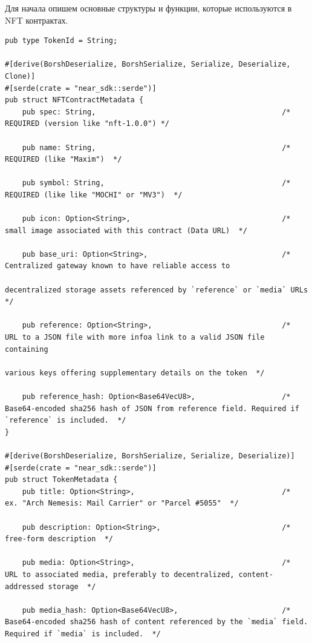 Для начала опишем основные структуры и функции\cite{corestandard}, которые используются в NFT контрактах.

\begin{verbatim}
pub type TokenId = String;

#[derive(BorshDeserialize, BorshSerialize, Serialize, Deserialize, Clone)]
#[serde(crate = "near_sdk::serde")]
pub struct NFTContractMetadata {
    pub spec: String,                                           /*  REQUIRED (version like "nft-1.0.0") */

    pub name: String,                                           /*  REQUIRED (like "Maxim")  */

    pub symbol: String,                                         /*  REQUIRED (like like "MOCHI" or "MV3")  */

    pub icon: Option<String>,                                   /*  small image associated with this contract (Data URL)  */

    pub base_uri: Option<String>,                               /*  Centralized gateway known to have reliable access to
                                                                    decentralized storage assets referenced by `reference` or `media` URLs  */

    pub reference: Option<String>,                              /*  URL to a JSON file with more infoa link to a valid JSON file containing
                                                                    various keys offering supplementary details on the token  */

    pub reference_hash: Option<Base64VecU8>,                    /*  Base64-encoded sha256 hash of JSON from reference field. Required if `reference` is included.  */
}

#[derive(BorshDeserialize, BorshSerialize, Serialize, Deserialize)]
#[serde(crate = "near_sdk::serde")]
pub struct TokenMetadata {
    pub title: Option<String>,                                  /*  ex. "Arch Nemesis: Mail Carrier" or "Parcel #5055"  */

    pub description: Option<String>,                            /*  free-form description  */

    pub media: Option<String>,                                  /*  URL to associated media, preferably to decentralized, content-addressed storage  */

    pub media_hash: Option<Base64VecU8>,                        /*  Base64-encoded sha256 hash of content referenced by the `media` field. Required if `media` is included.  */


\end{verbatim}
